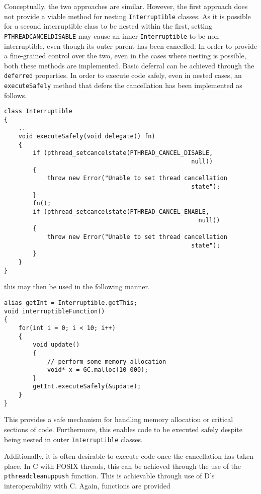 Conceptually, the two approaches are similar. However, the first approach does 
not provide a viable method for nesting \texttt{Interruptible} classes. As it is 
possible for a second interruptible class to be nested within the first, setting 
\texttt{PTHREAD\textunderscore{}CANCEL\textunderscore{}DISABLE} may cause an 
inner \texttt{Interruptible} to be non-interruptible, even though its outer parent 
has been cancelled. In order to provide a fine-grained control over the two, 
even in the cases where nesting is possible, both these methods are implemented. 
Basic deferral can be achieved through the \texttt{deferred} properties. In order 
to execute code safely, even in nested cases, an \texttt{executeSafely} method that 
defers the cancellation has been implemented as follows. 
\begin{lstlisting}[basicstyle=\small]
class Interruptible
{
    ..
    void executeSafely(void delegate() fn)
    {
        if (pthread_setcancelstate(PTHREAD_CANCEL_DISABLE, 
                                                    null))
        {
            throw new Error("Unable to set thread cancellation 
                                                    state");
        }
        fn();
        if (pthread_setcancelstate(PTHREAD_CANCEL_ENABLE, 
                                                      null))
        {
            throw new Error("Unable to set thread cancellation 
                                                    state");
        }
    }
}
\end{lstlisting}
this may then be used in the following manner. 
\begin{lstlisting}[basicstyle=\small]
alias getInt = Interruptible.getThis;
void interruptibleFunction() 
{
    for(int i = 0; i < 10; i++)
    {
        void update() 
        {
            // perform some memory allocation
            void* x = GC.malloc(10_000); 
        }
        getInt.executeSafely(&update);
    }
}
\end{lstlisting}
This provides a safe mechanism for handling memory allocation or critical sections 
of code. Furthermore, this enables code to be executed safely despite being 
nested in outer \texttt{Interruptible} classes. 
\par\bigskip\noindent
Additionally, it is often desirable to execute code once the cancellation has taken 
place. In C with POSIX threads, this can be achieved through the use of the 
\texttt{pthread\textunderscore{}cleanup\textunderscore{}push} function. 
This is achievable through use of D's interoperability with C. Again, functions are provided 
